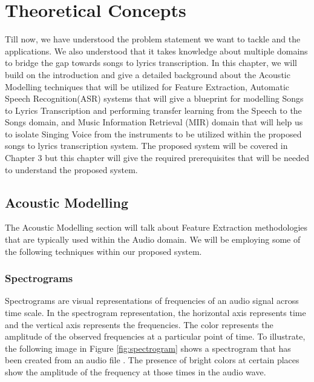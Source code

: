 
\chapter{Theoretical Concepts}%
\label{sec:fundamentals}

Till now, we have understood the problem statement we want to tackle and the applications. We also understood that it takes knowledge about multiple domains to bridge the gap towards songs to lyrics transcription. In this chapter, we will build on the introduction and give a detailed background about the Acoustic Modelling techniques that will be utilized for Feature Extraction, Automatic Speech Recognition(ASR) systems that will give a blueprint for modelling Songs to Lyrics Transcription and performing transfer learning from the Speech to the Songs domain, and Music Information Retrieval (MIR) domain that will help us to isolate Singing Voice from the instruments to be utilized within the proposed songs to lyrics transcription system. The proposed system will be covered in Chapter 3 but this chapter will give the required prerequisites that will be needed to understand the proposed system.

\section{Acoustic Modelling}%
\label{sec:acousticmodelling}

The Acoustic Modelling section will talk about Feature Extraction methodologies that are typically used within the Audio domain. We will be employing some of the following techniques within our proposed system.

\subsection{Spectrograms}%
\label{sec:spectrograms}

Spectrograms are visual representations of frequencies of an audio signal across time scale. In the spectrogram representation, the horizontal axis represents time and the vertical axis represents the frequencies. The color represents the amplitude of the observed frequencies at a particular point of time. To illustrate, the following image in Figure \ref{fig:spectrogram} shows a spectrogram that has been created from an audio file  \cite{mcfee2015librosa}  . The presence of bright colors at certain places show the amplitude of the frequency at those times in the audio wave.

